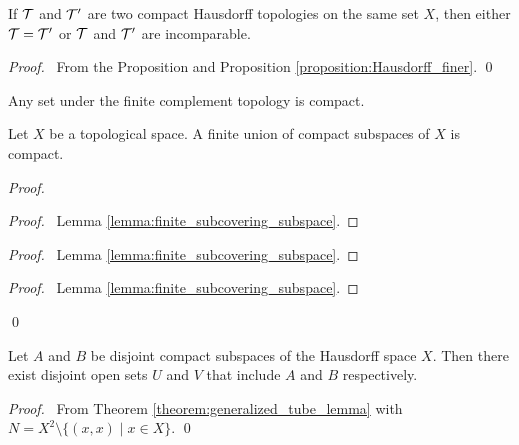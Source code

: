 \begin{corollary}
    If $\mathcal{T}$ and $\mathcal{T}'$ are two compact Hausdorff topologies on the same set $X$, then either $\mathcal{T} = \mathcal{T}'$ or $\mathcal{T}$ and $\mathcal{T}'$ are incomparable.
\end{corollary}

\begin{proof}
    \pf\ From the Proposition and Proposition \ref{proposition:Hausdorff_finer}. \qed
\end{proof}

\begin{example}
    Any set under the finite complement topology is compact.
\end{example}

\begin{proposition}
    Let $X$ be a topological space. A finite union of compact subspaces of $X$ is compact.
\end{proposition}

\begin{proof}
    \pf
    \begin{proof}
        \pf\ Lemma \ref{lemma:finite_subcovering_subspace}.
    \end{proof}
    \begin{proof}
        \pf\ Lemma \ref{lemma:finite_subcovering_subspace}.
    \end{proof}
    \qedstep
    \begin{proof}
        \pf\ Lemma \ref{lemma:finite_subcovering_subspace}.
    \end{proof}
    \qed
\end{proof}

\begin{proposition}
    \label{proposition:disjoint_neighbourhoods_compact_Hausdorff}
    Let $A$ and $B$ be disjoint compact subspaces of the Hausdorff space $X$.
    Then there exist disjoint open sets $U$ and $V$ that include $A$ and $B$
    respectively.
\end{proposition}

\begin{proof}
    \pf\ From Theorem \ref{theorem:generalized_tube_lemma} with $N = X^2 \setminus \{ (x,x) \mid x \in X \}$. \qed
\end{proof}

